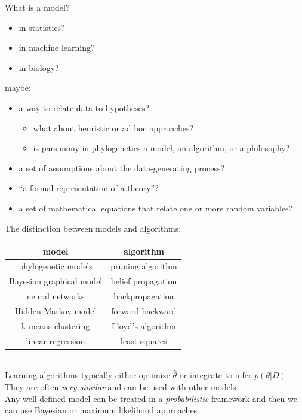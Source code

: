 \documentclass[mathserif]{beamer}
\begin{document}
\begin{frame}
    \begin{block}{What is a model?}
    \begin{itemize}
        \item in statistics?
        \item in machine learning?
        \item in biology?
    \end{itemize}
    \end{block}
    \begin{block}{maybe:}
    \begin{itemize}
     \item a way to relate data to hypotheses?
        \begin{itemize}
            \item what about heuristic or ad hoc approaches? 
            \item is parsimony in phylogenetics a model, an algorithm, or a philosophy?
        \end{itemize}
     \item a set of assumptions about the data-generating process?
     \item ``a formal representation of a theory''?
     \item a set of mathematical equations that relate one or more random variables?
    \end{itemize}
    \end{block}
\end{frame}


\begin{frame}
    \begin{block}{The distinction between models and algorithms:}
    \bigskip
    \begin{tabular}{ c | c }
        model & algorithm \\
        \hline
        phylogenetic models & pruning algorithm \\
        Bayesian graphical model & belief propagation \\
        neural networks & backpropagation \\
        Hidden Markov model &  forward-backward \\
        k-means clustering &  Lloyd's algorithm \\
        linear regression & least-squares \\
    \end{tabular} \\
    \bigskip
        Learning algorithms typically either optimize $\hat{\theta}$ or integrate to infer $p(\theta|D)$ \\
    \bigskip
        They are often \textit{very similar} and can be used with other models \\
    \bigskip
        Any well defined model can be treated in a \textit{probabilistic} framework and
        then we can use Bayesian \alert{or} maximum likelihood approaches
    \end{block}
\end{frame}
\end{document}
